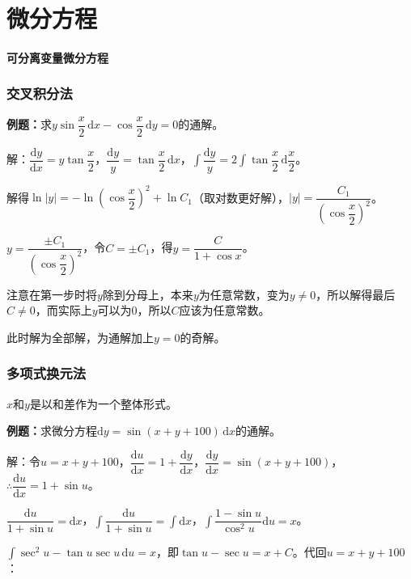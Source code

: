 
\section{微分方程}

\paragraph{可分离变量微分方程}

\subsubsection{交叉积分法}

\textbf{例题：}求$y\sin\dfrac{x}{2}\,\textrm{d}x-\cos\dfrac{x}{2}\,\textrm{d}y=0$的通解。

解：$\dfrac{\textrm{d}y}{\textrm{d}x}=y\tan\dfrac{x}{2}$，$\dfrac{\textrm{d}y}{y}=\tan\dfrac{x}{2}\,\textrm{d}x$，$\displaystyle{\int\dfrac{\textrm{d}y}{y}=2\int\tan\dfrac{x}{2}\,\textrm{d}\dfrac{x}{2}}$。

解得$\ln\vert y\vert=-\ln\left(\cos\dfrac{x}{2}\right)^2+\ln C_1$（取对数更好解），$\vert y\vert=\dfrac{C_1}{\left(\cos\dfrac{x}{2}\right)^2}$。

$y=\dfrac{\pm C_1}{\left(\cos\dfrac{x}{2}\right)^2}$，令$C=\pm C_1$，得$y=\dfrac{C}{1+\cos x}$。

注意在第一步时将$y$除到分母上，本来$y$为任意常数，变为$y\neq0$，所以解得最后$C\neq0$，而实际上$y$可以为0，所以$C$应该为任意常数。

此时解为全部解，为通解加上$y=0$的奇解。

\subsubsection{多项式换元法}

$x$和$y$是以和差作为一个整体形式。

\textbf{例题：}求微分方程$\textrm{d}y=\sin(x+y+100)\,\textrm{d}x$的通解。

解：令$u=x+y+100$，$\dfrac{\textrm{d}u}{\textrm{d}x}=1+\dfrac{\textrm{d}y}{\textrm{d}x}$，$\dfrac{\textrm{d}y}{\textrm{d}x}=\sin(x+y+100)$，$\therefore\dfrac{\textrm{d}u}{\textrm{d}x}=1+\sin u$。

$\dfrac{\textrm{d}u}{1+\sin u}=\textrm{d}x$，$\displaystyle{\int\dfrac{\textrm{d}u}{1+\sin u}}=\int\textrm{d}x$，$\displaystyle{\int\dfrac{1-\sin u}{\cos^2u}}\textrm{d}u=x$。

$\int\sec^2u-\tan u\sec u\,\textrm{d}u=x$，即$\tan u-\sec u=x+C$。代回$u=x+y+100$：

